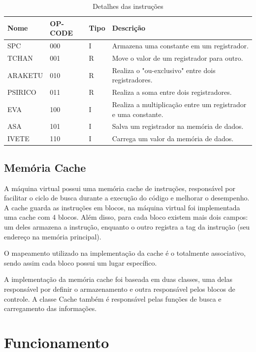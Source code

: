 \documentclass[
	12pt,				%
	oneside,			%
	a4paper,			%
	english,			%
	french,				%
	spanish,			%
	brazil				%
	]{abntex2}
\begin{document}
\begin{table}[htb]
\center
\footnotesize
\begin{tabular}{|p{2cm}|p{2cm}|p{1cm}|p{9.5cm}|}
  \hline
   \textbf{Nome} & \textbf{OP-CODE} & \textbf{Tipo} & \textbf{Descrição} \\
    \hline
    SPC & 000 & I & Armazena uma constante em um registrador.\\
    \hline
    TCHAN & 001 & R & Move o valor de um registrador para outro.\\
    \hline
    ARAKETU & 010 & R & Realiza o "ou-exclusivo" entre dois registradores.\\
    \hline
    PSIRICO & 011 & R & Realiza a soma entre dois registradores.\\
    \hline
    EVA & 100 & I & Realiza a multiplicação entre um registrador e uma constante.\\
    \hline
    ASA & 101 & I & Salva um registrador na memória de dados.\\
    \hline
    IVETE & 110 & I & Carrega um valor da memória de dados.\\
    \hline
\end{tabular}
\caption{Detalhes das instruções}
\label{table6:sample}
\end{table}

\section{Memória Cache}

A máquina virtual possui uma memória cache de instruções, responsável por facilitar o ciclo de busca durante a execução do código e melhorar o desempenho. A cache guarda as instruções em blocos, na máquina virtual foi implementada uma cache com 4 blocos. Além disso, para cada bloco existem mais dois campos: um deles armazena a instrução, enquanto o outro registra a tag da instrução (seu endereço na memória principal).

O mapeamento utilizado na implementação da cache é o totalmente associativo, sendo assim cada bloco possui um lugar específico.

A implementação da memória cache foi baseada em duas classes, uma delas responsável por definir o armazenamento e outra responsável pelos blocos de controle. A classe Cache também é responsável pelas funções de busca e carregamento das informações.

\chapter{Funcionamento}
\end{document}
